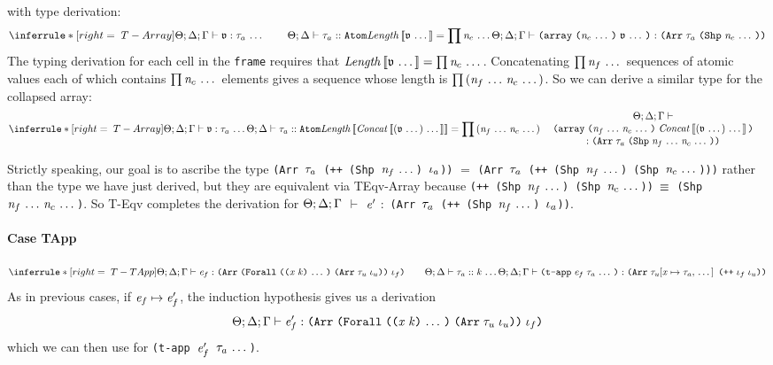 \begin{sproof}
  with type derivation:
  \[{\infr[T-Array]
    {\sequence{\typeof{\sEnv}{\kEnv}{\tEnv}
        {\atval}{\type_a}}
      \qquad
      \kindof{\sEnv}{\kEnv}{\type_a}{\kindatom}
      \\\\
      \mathit{Length}\llb\sequence{\atval}\rrb = \prod{\sequence{\nat_c}}}
    {\typeof{\sEnv}{\kEnv}{\tEnv}
      {\arrlit{\sequence{\atval}}{\sequence{\nat_c}}}
      {\typearray{\type_a}{\idxshape{\sequence{\nat_c}}}}}}\]
  The typing derivation for each cell in the {\tt frame}
  requires that $\mathit{Length}\left\llbracket\mathfrak{v} \, \ldots \,\right\rrbracket = \prod{\mathit{n}_c \, \ldots \,}$.
  Concatenating $\prod{\mathit{n}_f \, \ldots \,}$ sequences of atomic values
  each of which contains $\prod{\mathit{n}_c \, \ldots \,}$ elements
  gives a sequence whose length is $\prod{\left( \mathit{n}_f \, \ldots \,\mathit{n}_c \, \ldots \, \right)}$.
  So we can derive a similar type for the collapsed array:
  \[{\infr[T-Array]
    {\sequence{\typeof{\sEnv}{\kEnv}{\tEnv}
        {\atval}{\type_a}}
      \\
      \kindof{\sEnv}{\kEnv}{\type_a}{\kindatom}
      \\\\
      \mathit{Length}\llb\mathit{Concat}\llb\sequence{\parens{\sequence{\atval}}}\rrb\rrb
      = \prod{\parens{\sequence{\nat_f}\sequence{\nat_c}}}}
    {\parbox{0.65\textwidth}
      {\centering ${\sEnv};{\kEnv};{\tEnv}\vdash
        {\arrlit
          {\mathit{Concat}\llb\sequence{\parens{\sequence{\atval}}}\rrb}
          {\sequence{\nat_f}\sequence{\nat_c}}}$
        $:{\typearray{\type_a}{\idxshape{\sequence{\nat_f}\sequence{\nat_c}}}}$}}}\]

  Strictly speaking, our goal is to ascribe the type
  {\tt (Arr $\mathit{\tau}_a$ (++ (Shp $\mathit{n}_f \, \ldots \,$) $\mathit{\iota}_a$))}  $=$
  {\tt (Arr $\mathit{\tau}_a$ (++ (Shp $\mathit{n}_f \, \ldots \,$) (Shp $\mathit{n}_c \, \ldots \,$)))}
  rather than the type we have just derived,
  but they are equivalent via {\sc TEqv-Array} because
  {\tt (++ (Shp $\mathit{n}_f \, \ldots \,$) (Shp $\mathit{n}_c \, \ldots \,$))
    $\equiv$
    (Shp $\mathit{n}_f \, \ldots \, \mathit{n}_c \, \ldots \,$)}.
  So {\sc T-Eqv} completes the derivation for
${\Theta};{\Delta};{\Gamma}$
$\vdash$
$\mathit{e}'$
$:$
{\tt (Arr $\mathit{\tau}_a$ (++ (Shp $\mathit{n}_f \, \ldots \,$) $\mathit{\iota}_a$))}.

  \paragraph{Case {\sc TApp}}
  \[{\infr[T-TApp]
    {\typeof{\sEnv}{\kEnv}{\tEnv}
      {\expr_f}
      {\typearray
        {\typeuniv
          {\sequence{\notevar{\var}{\kind}}}
          {\typearray{\type_u}{\idx_u}}}
        {\idx_f}}
      \qquad
      \sequence{\kindof{\sEnv}{\kEnv}{\type_a}{\kind}}}
    {\typeof{\sEnv}{\kEnv}{\tEnv}
      {\tapp{\expr_f}{\sequence{\type_a}}}
      {\typearray
        {\seqsubst{\type_u}{\var}{\type_a}}
        {\idxappend{\idx_f \; \idx_u}}}}}\]
  As in previous cases, if $\mathit{e}_f \mapsto \mathit{e}_f'$,
  the induction hypothesis gives us a derivation
  $$\typeof{\sEnv}{\kEnv}{\tEnv}
  {\expr_f'}
  {\typearray
    {\typeuniv
      {\sequence{\notevar{\var}{\kind}}}
      {\typearray{\type_u}{\idx_u}}}
    {\idx_f}}$$
  which we can then use for
  {\tt (t-app $\mathit{e}_f'$ $\mathit{\tau}_a \, \ldots \,$)}.


\end{sproof}
